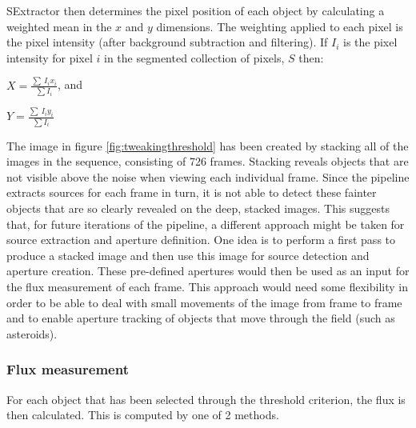 SExtractor then determines the pixel position of each object by calculating a weighted mean in the $x$ and $y$ dimensions. The weighting applied to each pixel is the pixel intensity (after background subtraction and filtering). If $I_{i}$ is the pixel intensity for pixel $i$ in the segmented collection of pixels, $S$ then:

$ X = \frac{\sum\ I_{i}x_{i}}{\sum I_i}$, and

$ Y = \frac{\sum\ I_{i}y_{i}}{\sum I_i}$

The image in figure \ref{fig:tweakingthreshold} has been created by stacking all of the images in the sequence, consisting of 726 frames. Stacking reveals objects that are not visible above the noise when viewing each individual frame. Since the pipeline extracts sources for each frame in turn, it is not able to detect these fainter objects that are so clearly revealed on the deep, stacked images. This suggests that, for future iterations of the pipeline, a different approach might be taken for source extraction and aperture definition. One idea is to perform a first pass to produce a stacked image and then use this image for source detection and aperture creation. These pre-defined apertures would then be used as an input for the flux measurement of each frame. This approach would need some flexibility in order to be able to deal with small movements of the image from frame to frame and to enable aperture tracking of objects that move through the field (such as asteroids).

\subsubsection{Flux measurement}
For each object that has been selected through the threshold criterion, the flux is then calculated. This is computed by one of 2 methods. 


